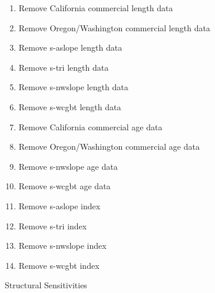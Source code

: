 \documentclass[11pt,
  english,
  a4paper,
]{article}
\begin{document}
\begin{enumerate}
   
  \item Remove California commercial length data
  
  \item Remove Oregon/Washington commercial length data
  
  \item Remove \gls{s-aslope} length data
  
  \item Remove \gls{s-tri} length data
  
  \item Remove \gls{s-nwslope} length data
  
  \item Remove \gls{s-wcgbt} length data
  
  \item Remove California commercial age data
  
  \item Remove Oregon/Washington commercial age data
  
  \item Remove \gls{s-nwslope} age data
  
  \item Remove \gls{s-wcgbt} age data
  
  \item Remove \gls{s-aslope} index
  
  \item Remove \gls{s-tri} index
  
  \item Remove \gls{s-nwslope} index
  
  \item Remove \gls{s-wcgbt} index
  
\end{enumerate}


Structural Sensitivities

\leavevmode\tagmcend\tagstructend\par
\end{document}
